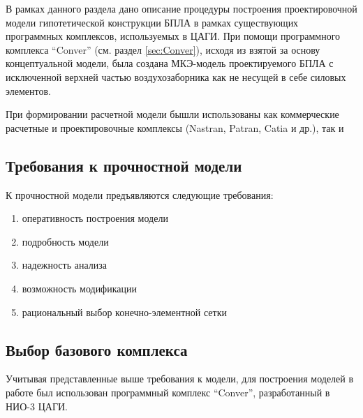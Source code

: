 
В рамках данного раздела дано описание процедуры построения проектировочной модели гипотетической конструкции БПЛА в рамках существующих программных комплексов, используемых в ЦАГИ. При помощи программного комплекса ``Conver'' (см. раздел \ref{sec:Conver}), исходя из взятой за основу концептуальной модели, была создана МКЭ-модель проектируемого БПЛА с исключенной верхней частью воздухозаборника как не несущей в себе силовых элементов. 

При формировании расчетной модели бышли использованы как коммерческие расчетные и проектировочные комплексы (Nastran, Patran, Catia и др.), так и 



\subsection{Требования к прочностной модели}

К прочностной модели предъявляются следующие требования:

\begin{enumerate}
\item оперативность построения модели
\item подробность модели
\item надежность анализа
\item возможность модификации 
\item рациональный выбор конечно-элементной сетки
\end{enumerate}

\subsection{Выбор базового комплекса}
Учитывая представленные выше требования к модели, для построения моделей в работе был использован программный комплекс ``Conver'', разработанный в НИО-3 ЦАГИ. 


